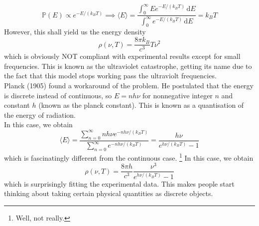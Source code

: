 $$\mathbb P(E)\propto e^{-E/(k_BT)}\implies \langle E\rangle=\frac{\int_0^\infty Ee^{-E/(k_BT)}\,\mathrm dE}{\int_0^\infty e^{-E/(k_BT)}\,\mathrm dE}=k_BT$$
However, this shall yield us the energy density
$$\rho(\nu,T)=\frac{8\pi k_B}{c^3}T\nu^2$$
which is obviously NOT compliant with experimental results except for small frequencies.
This is known as the ultraviolet catastrophe, getting its name due to the fact that this model stops working pass the ultraviolt frequencies.\\
Planck (1905) found a workaround of the problem.
He postulated that the energy is discrete instead of continuous, so $E=nh\nu$ for nonnegative integer $n$ and constant $h$ (known as the planck constant).
This is known as a quantisation of the energy of radiation.\\
In this case, we obtain
$$\langle E\rangle=\frac{\sum_{n=0}^\infty nh\nu e^{-nh\nu/(k_BT)}}{\sum_{n=0}^\infty e^{-nh\nu/(k_BT)}}=\frac{h\nu}{e^{h\nu/(k_BT)}-1}$$
which is fascinatingly different from the continuous case.
\footnote{Well, not really.}
In this case, we obtain
$$\rho(\nu,T)=\frac{8\pi h}{c^3}\frac{\nu^3}{e^{h\nu/(k_BT)}-1}$$
which is surprisingly fitting the experimental data.
This makes people start thinking about taking certain physical quantities as discrete objects.
